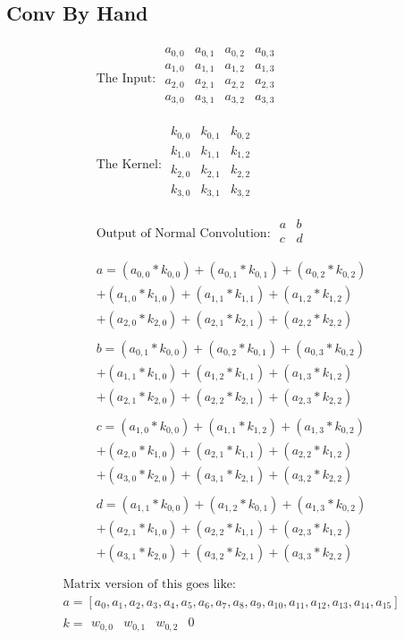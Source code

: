 \documentclass[../main.tex]{subfiles}
\begin{document}
\subsection{Conv By Hand}
\begin{align*}
  \text{The Input:   }
\begin{matrix}
  a_{0,0} & a_{0,1} & a_{0,2} & a_{0,3}\\
  a_{1,0} & a_{1,1} & a_{1,2} & a_{1,3}\\
  a_{2,0} & a_{2,1} & a_{2,2} & a_{2,3}\\
  a_{3,0} & a_{3,1} & a_{3,2} & a_{3,3}\\
\end{matrix}\\ \\
\text{The Kernel:   }
\begin{matrix}
  k_{0,0} & k_{0,1} & k_{0,2}\\
  k_{1,0} & k_{1,1} & k_{1,2}\\
  k_{2,0} & k_{2,1} & k_{2,2}\\
  k_{3,0} & k_{3,1} & k_{3,2}\\
\end{matrix}\\ \\
\text{Output of Normal Convolution:    }
\begin{matrix}
  a & b \\
  c & d \\
\end{matrix}\\ \\
a = (a_{0,0}*k_{0,0})+(a_{0,1}*k_{0,1})+(a_{0,2}*k_{0,2})\\+(a_{1,0}*k_{1,0})+(a_{1,1}*k_{1,1})+(a_{1,2}*k_{1,2})\\+(a_{2,0}*k_{2,0})+(a_{2,1}*k_{2,1})+(a_{2,2}*k_{2,2}) \\ \\
b = (a_{0,1}*k_{0,0})+(a_{0,2}*k_{0,1})+(a_{0,3}*k_{0,2})\\+(a_{1,1}*k_{1,0})+(a_{1,2}*k_{1,1})+(a_{1,3}*k_{1,2})\\+(a_{2,1}*k_{2,0})+(a_{2,2}*k_{2,1})+(a_{2,3}*k_{2,2}) \\ \\
c = (a_{1,0}*k_{0,0})+(a_{1,1}*k_{1,2})+(a_{1,3}*k_{0,2})\\+(a_{2,0}*k_{1,0})+(a_{2,1}*k_{1,1})+(a_{2,2}*k_{1,2})\\+(a_{3,0}*k_{2,0})+(a_{3,1}*k_{2,1})+(a_{3,2}*k_{2,2}) \\ \\
d = (a_{1,1}*k_{0,0})+(a_{1,2}*k_{0,1})+(a_{1,3}*k_{0,2})\\+(a_{2,1}*k_{1,0})+(a_{2,2}*k_{1,1})+(a_{2,3}*k_{1,2})\\+(a_{3,1}*k_{2,0})+(a_{3,2}*k_{2,1})+(a_{3,3}*k_{2,2}) \\ \\
\end{align*}
\begin{align*}
\text{Matrix version of this goes like: }\\
a = [a_0,a_1,a_2,a_3,a_4,a_5,a_6,a_7,a_8,a_9,a_{10},a_{11},a_{12},a_{13},a_{14},a_{15}] \\
k = \begin{matrix}
  w_{0,0} & w_{0,1} & w_{0,2} & 0
\end{matrix}
\end{align*}
\end{document}

